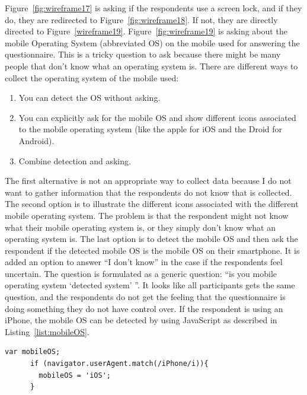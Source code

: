     Figure~\ref{fig:wireframe17} is asking if the respondents use a screen lock, and if they do, they are redirected to Figure~\ref{fig:wireframe18}. If not, they are directly directed to Figure~\ref{wireframe19}. Figure~\ref{fig:wireframe19} is asking about the mobile Operating System (abbreviated OS) on the mobile used for answering the questionnaire. This is a tricky question to ask because there might be many people that don't know what an operating system is. There are different ways to collect the operating system of the mobile used:

      \begin{enumerate}
        \item You can detect the OS without asking.
        \item You can explicitly ask for the mobile OS and show different icons associated to the mobile operating system (like the apple for iOS and the Droid for Android). 
        \item Combine detection and asking. 
      \end{enumerate}

    The first alternative is not an appropriate way to collect data because I do not want to gather information that the respondents do not know that is collected. The second option is to illustrate the different icons associated with the different mobile operating system. The problem is that the respondent might not know what their mobile operating system is, or they simply don't know what an operating system is. The last option is to detect the mobile OS and then ask the respondent if the detected mobile OS is the mobile OS on their smartphone. It is added an option to answer ``I don't know'' in the case if the respondents feel uncertain. The question is formulated as a generic question: ``is you mobile operating system `detected system' ''. It looks like all participants gets the same question, and the respondents do not get the feeling that the questionnaire is doing something they do not have control over. If the respondent is using an iPhone, the mobile OS can be detected by using JavaScript as described in Listing~\ref{list:mobileOS}.

    \medskip
    \begin{lstlisting}[caption=Detecting mobile OS, label=list:mobileOS]
      var mobileOS;
      if (navigator.userAgent.match(/iPhone/i)){
        mobileOS = 'iOS';
      }
    \end{lstlisting}

